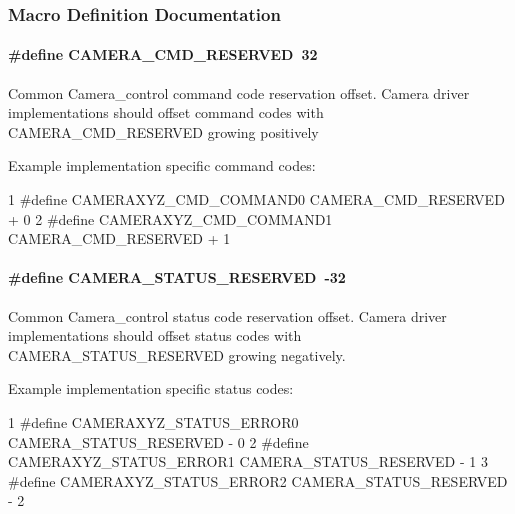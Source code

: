 \subsubsection{Macro Definition Documentation}
\paragraph[{C\+A\+M\+E\+R\+A\+\_\+\+C\+M\+D\+\_\+\+R\+E\+S\+E\+R\+V\+E\+D}]{\setlength{\rightskip}{0pt plus 5cm}\#define C\+A\+M\+E\+R\+A\+\_\+\+C\+M\+D\+\_\+\+R\+E\+S\+E\+R\+V\+E\+D~32}\label{group___c_a_m_e_r_a___c_o_n_t_r_o_l_gaed2b3df48a75ec7e6e78320bb3a48eb9}
Common Camera\+\_\+control command code reservation offset. Camera driver implementations should offset command codes with C\+A\+M\+E\+R\+A\+\_\+\+C\+M\+D\+\_\+\+R\+E\+S\+E\+R\+V\+E\+D growing positively

Example implementation specific command codes\+: 
\begin{DoxyCode}
1 #define CAMERAXYZ\_CMD\_COMMAND0   CAMERA\_CMD\_RESERVED + 0
2 #define CAMERAXYZ\_CMD\_COMMAND1   CAMERA\_CMD\_RESERVED + 1
\end{DoxyCode}
\paragraph[{C\+A\+M\+E\+R\+A\+\_\+\+S\+T\+A\+T\+U\+S\+\_\+\+R\+E\+S\+E\+R\+V\+E\+D}]{\setlength{\rightskip}{0pt plus 5cm}\#define C\+A\+M\+E\+R\+A\+\_\+\+S\+T\+A\+T\+U\+S\+\_\+\+R\+E\+S\+E\+R\+V\+E\+D~-\/32}\label{group___c_a_m_e_r_a___c_o_n_t_r_o_l_ga13b3728d2673d72db6cc71744a0cbedf}
Common Camera\+\_\+control status code reservation offset. Camera driver implementations should offset status codes with C\+A\+M\+E\+R\+A\+\_\+\+S\+T\+A\+T\+U\+S\+\_\+\+R\+E\+S\+E\+R\+V\+E\+D growing negatively.

Example implementation specific status codes\+: 
\begin{DoxyCode}
1 #define CAMERAXYZ\_STATUS\_ERROR0  CAMERA\_STATUS\_RESERVED - 0
2 #define CAMERAXYZ\_STATUS\_ERROR1  CAMERA\_STATUS\_RESERVED - 1
3 #define CAMERAXYZ\_STATUS\_ERROR2  CAMERA\_STATUS\_RESERVED - 2
\end{DoxyCode}
 